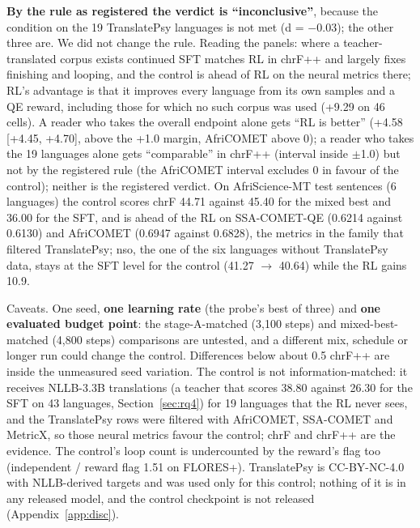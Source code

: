 \textbf{By the rule as registered the verdict is ``inconclusive''}, because the condition on the 19 TranslatePsy languages is not met (d = \ensuremath{-}0.03); the other three are. We did not change the rule. Reading the panels: where a teacher-translated corpus exists continued SFT matches RL in chrF++ and largely fixes finishing and looping, and the control is ahead of RL on the neural metrics there; RL's advantage is that it improves every language from its own samples and a QE reward, including those for which no such corpus was used (+9.29 on 46 cells). A reader who takes the overall endpoint alone gets ``RL is better'' (+4.58 [+4.45, +4.70], above the +1.0 margin, AfriCOMET above 0); a reader who takes the 19 languages alone gets ``comparable'' in chrF++ (interval inside $\pm$1.0) but not by the registered rule (the AfriCOMET interval excludes 0 in favour of the control); neither is the registered verdict. On AfriScience-MT test sentences (6 languages) the control scores chrF 44.71 against 45.40 for the mixed best and 36.00 for the SFT, and is ahead of the RL on SSA-COMET-QE (0.6214 against 0.6130) and AfriCOMET (0.6947 against 0.6828), the metrics in the family that filtered TranslatePsy; nso, the one of the six languages without TranslatePsy data, stays at the SFT level for the control (41.27 $\to$ 40.64) while the RL gains 10.9.

Caveats. One seed, \textbf{one learning rate} (the probe's best of three) and \textbf{one evaluated budget point}: the stage-A-matched (3,100 steps) and mixed-best-matched (4,800 steps) comparisons are untested, and a different mix, schedule or longer run could change the control. Differences below about 0.5 chrF++ are inside the unmeasured seed variation. The control is not information-matched: it receives NLLB-3.3B translations (a teacher that scores 38.80 against 26.30 for the SFT on 43 languages, Section~\ref{sec:rq4}) for 19 languages that the RL never sees, and the TranslatePsy rows were filtered with AfriCOMET, SSA-COMET and MetricX, so those neural metrics favour the control; chrF and chrF++ are the evidence. The control's loop count is undercounted by the reward's flag too (independent / reward flag 1.51 on FLORES+). TranslatePsy is CC-BY-NC-4.0 with NLLB-derived targets and was used only for this control; nothing of it is in any released model, and the control checkpoint is not released (Appendix~\ref{app:disc}). 



